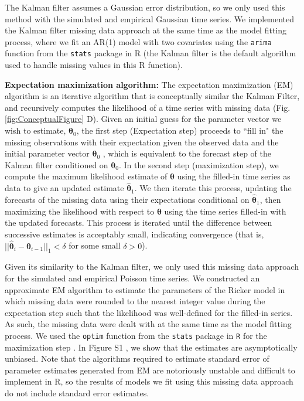 \documentclass{article}
\begin{document}
The Kalman filter assumes a Gaussian error distribution, so we only used this method with the simulated and empirical Gaussian time series. We implemented the Kalman filter missing data approach at the same time as the model fitting process, where we fit an AR(1) model with two covariates using the \texttt{arima} function from the \texttt{stats} package in R \citep{r_2021} (the Kalman filter is the default algorithm used to handle missing values in this R function). 

\noindent\textbf{Expectation maximization algorithm: }The expectation maximization (EM) algorithm is an iterative algorithm that is conceptually similar the Kalman Filter, and recursively computes the likelihood of a time series with missing data (Fig. \ref{fig:ConceptualFigure} D). Given an initial guess for the parameter vector we wish to estimate, ${\bm \theta}_0$, the first step (Expectation step) proceeds to ``fill in" the missing observations with their expectation given the observed data and the initial parameter vector ${\bm \theta}_0$ %
, which is equivalent to the forecast step of the Kalman filter conditioned on ${\bm \theta}_0$. In the second step (maximization step), we compute the maximum likelihood estimate of ${\bm \theta}$ using the filled-in time series as data to give an updated estimate $\hat {\bm \theta}_1$. We then iterate this process, updating the forecasts of the missing data using their expectations conditional on $\hat {\bm \theta}_1$, then maximizing the likelihood with respect to $\bm \theta$ using the time series filled-in with the updated forecasts. This process is iterated until the difference between successive estimates is acceptably small, indicating convergence (that is, $||\hat {\bm \theta}_i - \hat {\bm \theta}_{i-1}||_1 < \delta$ for some small $\delta > 0$).

Given its similarity to the Kalman filter, we only used this missing data approach for the simulated and empirical Poisson time series. We constructed an approximate EM algorithm to estimate the parameters of the Ricker model in which missing data were rounded to the nearest integer value during the expectation step such that the likelihood was well-defined for the filled-in series. As such, the missing data were dealt with at the same time as the model fitting process. We used the \texttt{optim} function from the \texttt{stats} package in \texttt{R} for the maximization step \citep{r_2021}. In Figure S1%
, we show that the estimates are asymptotically unbiased. Note that the algorithms required to estimate standard error of parameter estimates generated from EM are notoriously unstable and difficult to implement in R, so the results of models we fit using this missing data approach do not include standard error estimates. 
\end{document}
